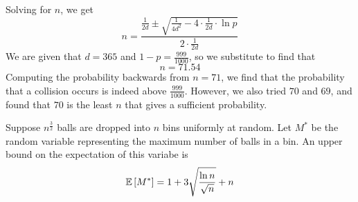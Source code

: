 \documentclass[11pt]{article}
\begin{document}
%
Solving for $n$, we get
%
\begin{equation*}
    n
    = \frac{
        \frac{1}{2d}
        \pm
        \sqrt{
            \frac{1}{4d^2} - 4 \cdot \frac{1}{2d} \cdot \ln p
        }
    }{
        2 \cdot \frac{1}{2d}
    }
\end{equation*}
%
We are given that $d = 365$ and $1 - p = \frac{999}{1000}$, so we substitute to
find that
%
\begin{equation*}
    n = 71.54
\end{equation*}
%
Computing the probability backwards from $n = 71$, we find that the probability
that a collision occurs is indeed above $\frac{999}{1000}$. However, we also
tried $70$ and $69$, and found that $70$ is the least $n$ that gives a
sufficient probability.



\begin{prop}
    Suppose $n^{\frac{3}{2}}$ balls are dropped into $n$ bins uniformly at
    random.
    Let $M^*$ be the random variable representing the maximum number of balls
    in a bin.
    An upper bound on the expectation of this variabe is
    \begin{equation*}
        \operatorname{\mathbb{E}}{\left[M^*\right]} = 1 + 3 \sqrt{\frac{\ln n}{\sqrt n}} + n
    \end{equation*}
\end{prop}
\end{document}
